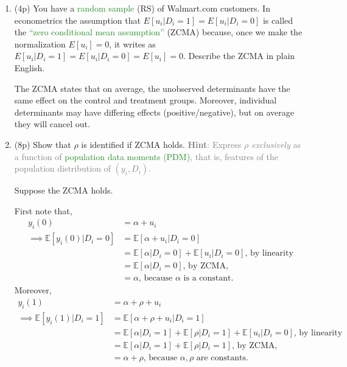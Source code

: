 \documentclass{article}
\begin{document}
\begin{enumerate}[label=\textbf{Q\arabic{enumi}}.,ref=Q\arabic{enumi}, wide=0pt, itemsep=1em, topsep=5pt]
\begin{enumerate}
        \item (4p) You have a \textcolor{ForestGreen}{random sample} (RS) of Walmart.com customers. In econometrics the assumption that $E\left[ u _{i}|D_{i}=1\right] =E\left[ u _{i}|D_{i}=0\right] $ is called the \textcolor{ForestGreen}{``zero conditional mean assumption''} (ZCMA) because, once we make the normalization $E[u_i]=0$, it writes as $E\left[ u _{i}|D_{i}=1\right] =E\left[ u _{i}|D_{i}=0\right] = E[u_i]=0$. Describe the ZCMA in plain English.
        \begin{solution}
            {
            The ZCMA states that on average, the unobserved determinants have the same effect on the control and treatment groups. Moreover, individual determinants may have differing effects (positive/negative), but on average they will cancel out.
            }
        \end{solution}
        

        \item (8p) Show that $\rho$ is identified if ZCMA holds. \textcolor{gray}{\textbf{Hint}: Express $\rho$ \textit{exclusively} as a function of \textcolor{ForestGreen}{population data moments (PDM)}, that is, features of the population distribution of $(y_i,D_i)$.}\label{item:identified_zmca}

        \begin{solution}
        { Suppose the ZCMA holds. \medskip

        First note that, 
        \begin{align*}
            y_i(0) &= \alpha + u_i \\
            \implies \mathbb{E}[y_i(0) | D_i = 0] &= \mathbb{E}[\alpha + u_i | D_i = 0]\\ 
             &= \mathbb{E}[\alpha|D_i = 0] + \mathbb{E}[u_i | D_i = 0] \text{, by linearity}\\
             &= \mathbb{E}[\alpha|D_i = 0] \text{, by ZCMA, }\\
             &= \alpha \text{, because $\alpha$ is a constant. }
        \end{align*}
        \medskip 
        Moreover,
        \begin{align*}
            y_i(1) &= \alpha + \rho + u_i \\
            \implies \mathbb{E}[y_i(1) | D_i = 1] &= \mathbb{E}[\alpha + \rho + u_i | D_i = 1]\\ 
             &= \mathbb{E}[\alpha|D_i = 1] + \mathbb{E}[\rho|D_i =1] + \mathbb{E}[u_i | D_i = 0] \text{, by linearity}\\
             &= \mathbb{E}[\alpha|D_i = 1] + \mathbb{E}[\rho|D_i =1] \text{, by ZCMA, }\\
             &= \alpha + \rho \text{, because $\alpha, \rho$ are constants. }
        \end{align*}
        
}
\end{solution}
\end{enumerate}
\end{enumerate}
\end{document}
